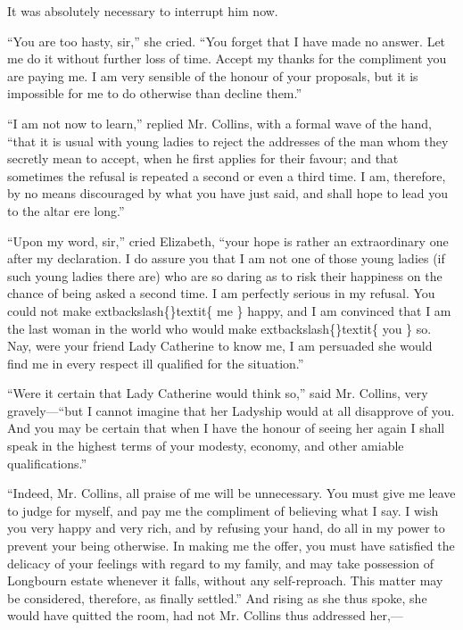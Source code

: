 \documentclass[10pt]{book}
\begin{document}
   It was absolutely necessary to interrupt him now.
  

   “You are too hasty, sir,” she cried. “You forget that
   I have made no
answer. Let me do it without further loss of time. Accept my thanks for
the compliment you are paying me. I am very sensible of the honour of
your proposals, but it is impossible for me to do otherwise than decline
them.”
  

   “I am not now to learn,” replied Mr. Collins, with a formal wave of the
hand, “that it is usual with young ladies to reject the addresses of the
man whom they secretly mean to accept, when he first applies for their
favour; and that sometimes the refusal is repeated a second or even a
third time. I am, therefore, by no means discouraged by what you have
just said, and shall hope to lead you to the altar ere long.”
  

   “Upon my word, sir,” cried Elizabeth, “your hope is rather an
extraordinary one after my declaration. I do assure you that I am not
one of those young ladies (if such young ladies there are) who are so
daring as to risk their happiness on the chance of being asked a second
time. I am perfectly serious in my refusal. You could not make
   	extbackslash\{\}textit\{
    me
   \}
   happy, and I am convinced that I am the last woman in the world who
would make
   	extbackslash\{\}textit\{
    you
   \}
   so. Nay, were your friend Lady Catherine to know me, I
am persuaded she would find me in every respect ill qualified for the
situation.”
  

   “Were it certain that Lady Catherine would think so,” said Mr. Collins,
very gravely—“but I cannot imagine that her Ladyship would at all
disapprove of you. And you may be certain that when I have the honour of
seeing her again I shall speak in the highest terms of your modesty,
economy, and other amiable qualifications.”
  

   “Indeed, Mr. Collins, all praise of me will be unnecessary. You must
give me leave to judge for myself, and
   pay me the compliment of
believing what I say. I wish you very happy and very rich, and by
refusing your hand, do all in my power to prevent your being otherwise.
In making me the offer, you must have satisfied the delicacy of your
feelings with regard to my family, and may take possession of Longbourn
estate whenever it falls, without any self-reproach. This matter may be
considered, therefore, as finally settled.” And rising as she thus
spoke, she would have quitted the room, had not Mr. Collins thus
addressed her,—
  
\end{document}
